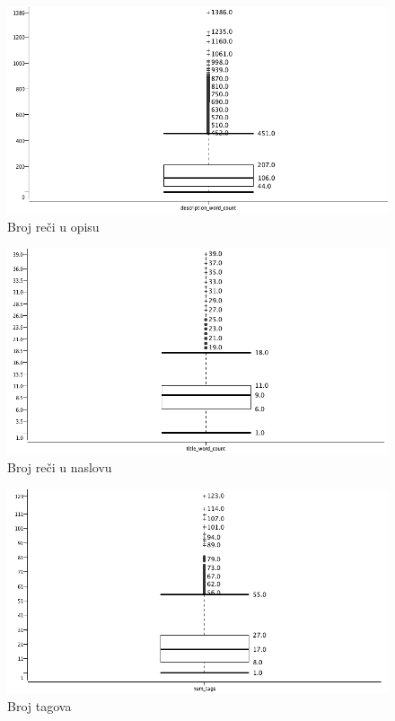 \documentclass[a4paper]{article}
\theoremstyle{definition}
\begin{document}
\begin{figure}[H]
\begin{center}
    \includegraphics[width=1\textwidth]{box_desc_word_count.png}
    \caption{Broj reči u opisu}
    \label{fig:boxDesc}
\end{center}
\end{figure}

\begin{figure}[H]
\begin{center}
    \includegraphics[width=1\textwidth]{box_title_word_count.png}
    \caption{Broj reči u naslovu}
\end{center}
\end{figure}

\begin{figure}[H]
\begin{center}
    \includegraphics[width=1\textwidth]{box_num-tag.png}
    \caption{Broj tagova}
\end{center}
\end{figure}
\end{document}
